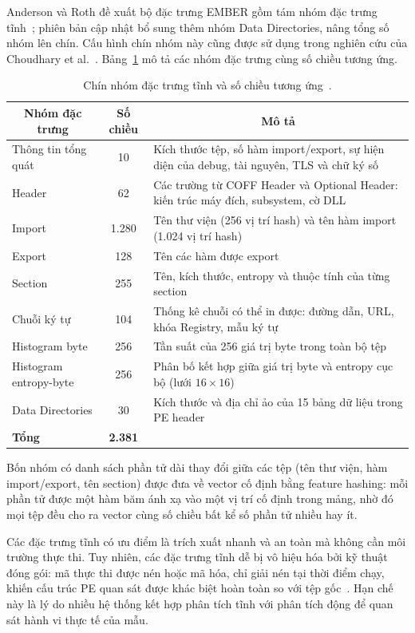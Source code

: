 \documentclass[../DoAn.tex]{subfiles}
\begin{document}
Anderson và Roth đề xuất bộ đặc trưng EMBER gồm tám nhóm đặc trưng
tĩnh~\cite{ember2018}; phiên bản cập nhật bổ sung thêm nhóm Data
Directories, nâng tổng số nhóm lên chín. Cấu hình chín nhóm này cũng
được sử dụng trong nghiên cứu của Choudhary et al.~\cite{choudhary2025}.
Bảng~\ref{tab:ember_features} mô tả các nhóm đặc trưng cùng số chiều
tương ứng.
\begin{table}[H]
\centering
\caption{Chín nhóm đặc trưng tĩnh và số chiều tương ứng~\cite{ember2018, choudhary2025}.}
\label{tab:ember_features}
\begin{tabular}{|l|c|p{8cm}|}
\hline
\multicolumn{1}{|c|}{\textbf{Nhóm đặc trưng}} & \multicolumn{1}{c|}{\textbf{Số chiều}} & \multicolumn{1}{c|}{\textbf{Mô tả}} \\
\hline
Thông tin tổng quát & 10 & Kích thước tệp, số hàm import/export, sự hiện diện của debug, tài nguyên, TLS và chữ ký số \\
\hline
Header & 62 & Các trường từ COFF Header và Optional Header: kiến trúc máy đích, subsystem, cờ DLL \\
\hline
Import & 1.280 & Tên thư viện (256 vị trí hash) và tên hàm import (1.024 vị trí hash) \\
\hline
Export & 128 & Tên các hàm được export \\
\hline
Section & 255 & Tên, kích thước, entropy và thuộc tính của từng section \\
\hline
Chuỗi ký tự & 104 & Thống kê chuỗi có thể in được: đường dẫn, URL, khóa Registry, mẫu ký tự \\
\hline
Histogram byte & 256 & Tần suất của 256 giá trị byte trong toàn bộ tệp \\
\hline
Histogram entropy-byte & 256 & Phân bố kết hợp giữa giá trị byte và entropy cục bộ (lưới $16\times16$) \\
\hline
Data Directories & 30 & Kích thước và địa chỉ ảo của 15 bảng dữ liệu trong PE header \\
\hline
\textbf{Tổng} & \textbf{2.381} & \\
\hline
\end{tabular}
\end{table}
Bốn nhóm có danh sách phần tử dài thay đổi giữa các tệp (tên thư viện,
hàm import/export, tên section) được đưa về vector cố định bằng feature
hashing: mỗi phần tử được một hàm băm ánh xạ vào một vị trí cố định
trong mảng, nhờ đó mọi tệp đều cho ra vector cùng số chiều bất kể số
phần tử nhiều hay ít.

Các đặc trưng tĩnh có ưu điểm là trích xuất nhanh và an toàn mà
không cần môi trường thực thi. Tuy nhiên, các đặc trưng tĩnh dễ bị vô hiệu hóa bởi kỹ thuật đóng
gói: mã thực thi được nén hoặc mã hóa, chỉ giải nén tại
thời điểm chạy, khiến cấu trúc PE quan sát được khác biệt hoàn toàn
so với tệp gốc~\cite{gibert2020}. Hạn chế này là lý do nhiều hệ thống
kết hợp phân tích tĩnh với phân tích động để quan sát hành vi thực tế
của mẫu.
\end{document}

